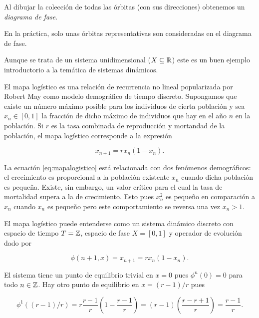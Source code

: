 \begin{definition}
  \label{def:phasediagram}Al dibujar la colecci\'on de todas las \'orbitas
  (con sus direcciones) obtenemos un {\emph{diagrama de fase}}.
\end{definition}
En la pr\'actica, solo unas \'orbitas representativas son consideradas en el diagrama de fase.

\begin{example}
Aunque se trata de un sistema unidimensional ($X \subseteq {\ensuremath{\mathbb{R}}}$) este es un buen ejemplo introductorio a la temática de sistemas dinámicos.

El mapa logístico es una relación de recurrencia no lineal popularizada por Robert May \cite{may76} como modelo demográfico de tiempo discreto.
Supongamos que existe un número máximo posible para los individuos de cierta población y sea $x_n \in [0,1]$ la fracción de dicho máximo de individuos que hay en el año $n$ en la población. Si $r$ es la tasa combinada de reproducción y mortandad de la población, el mapa logístico corresponde a la expresión

\begin{equation} \label{eq:mapalogistico}
x_{n+1} = rx_n(1-x_n).
\end{equation}

La ecuación \ref{eq:mapalogistico} está relacionada con dos fenómenos demográficos: el crecimiento es proporcional a la población existente $x_n$ cuando dicha población es pequeña. Existe, sin embargo, un valor crítico para el cual la tasa de mortalidad supera a la de crecimiento.
Esto pues $x_n^2$ es pequeño en comparación a $x_n$ cuando $x_n$ es pequeño pero este comportamiento se reversa una vez $x_n > 1$.

El mapa logístico puede entenderse como un sistema dinámico discreto con espacio de tiempo $T = {\mathbb{Z}}$, espacio de fase $X = [0,1]$ y operador de evolución dado por

\begin{equation} \label{eq:evolucionmapalogistico}
	\phi(n + 1, x) = x_{n+1} = rx_n(1-x_n).
\end{equation}

El sistema tiene un punto de equilibrio trivial en $x = 0$ pues $\phi^n(0) = 0$ para todo $n \in {\ensuremath{\mathbb{Z}}}$. Hay otro punto de equilibrio en $x = (r-1)/r$ pues

$$ \phi^1((r-1)/r) = r \frac{r-1}{r} \left(1 - \frac{r-1}{r} \right) = (r-1) \left( \frac{r - r + 1}{r} \right) = \frac{r-1}{r}. $$


\end{example}

